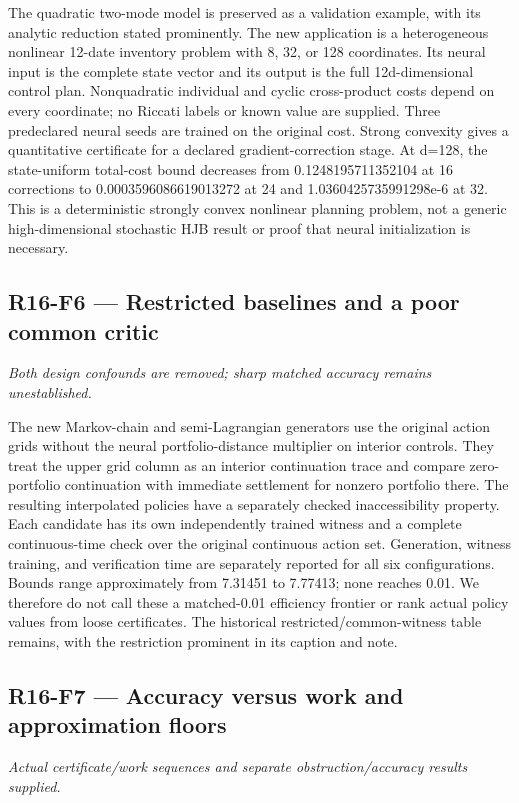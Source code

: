 \documentclass[ecta]{econsocart}
\theoremstyle{remark}
\begin{document}
The quadratic two-mode model is preserved as a validation example, with its analytic reduction stated prominently. The new application is a heterogeneous nonlinear 12-date inventory problem with 8, 32, or 128 coordinates. Its neural input is the complete state vector and its output is the full 12d-dimensional control plan. Nonquadratic individual and cyclic cross-product costs depend on every coordinate; no Riccati labels or known value are supplied. Three predeclared neural seeds are trained on the original cost. Strong convexity gives a quantitative certificate for a declared gradient-correction stage. At d=128, the state-uniform total-cost bound decreases from 0.1248195711352104 at 16 corrections to 0.0003596086619013272 at 24 and 1.0360425735991298e-6 at 32. This is a deterministic strongly convex nonlinear planning problem, not a generic high-dimensional stochastic HJB result or proof that neural initialization is necessary.

\subsection{R16-F6 --- Restricted baselines and a poor common critic}
\noindent\emph{Both design confounds are removed; sharp matched accuracy remains unestablished.}

The new Markov-chain and semi-Lagrangian generators use the original action grids without the neural portfolio-distance multiplier on interior controls. They treat the upper grid column as an interior continuation trace and compare zero-portfolio continuation with immediate settlement for nonzero portfolio there. The resulting interpolated policies have a separately checked inaccessibility property. Each candidate has its own independently trained witness and a complete continuous-time check over the original continuous action set. Generation, witness training, and verification time are separately reported for all six configurations. Bounds range approximately from 7.31451 to 7.77413; none reaches 0.01. We therefore do not call these a matched-0.01 efficiency frontier or rank actual policy values from loose certificates. The historical restricted/common-witness table remains, with the restriction prominent in its caption and note.

\subsection{R16-F7 --- Accuracy versus work and approximation floors}
\noindent\emph{Actual certificate/work sequences and separate obstruction/accuracy results supplied.}
\end{document}
